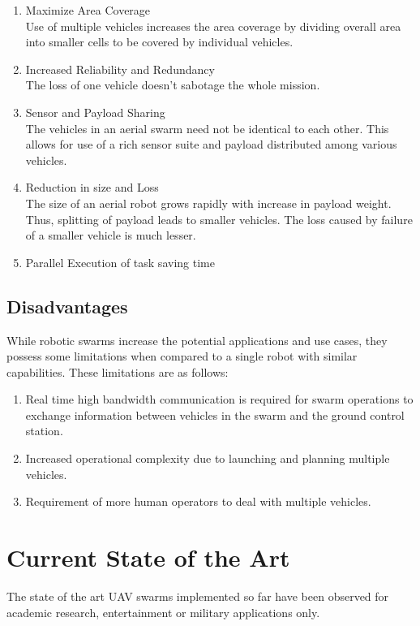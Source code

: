 \begin{spacing}{2}
\begin{enumerate}
    \item Maximize Area Coverage \\Use of multiple vehicles increases the area coverage by dividing overall area into smaller cells to be covered by individual vehicles.
    \item Increased Reliability and Redundancy \\The loss of one vehicle doesn't sabotage the whole mission.
    \item Sensor and Payload Sharing \\The vehicles in an aerial swarm need not be identical to each other. This allows for use of a rich sensor suite and payload distributed among various vehicles.
    \item Reduction in size and Loss \\The size of an aerial robot grows rapidly with increase in payload weight. Thus, splitting of payload leads to smaller vehicles. The loss caused by failure of a smaller vehicle is much lesser.
    \item Parallel Execution of task saving time
\end{enumerate}

\subsection*{Disadvantages}
While robotic swarms increase the potential applications and use cases, they possess some limitations when compared to a single robot with similar capabilities. These limitations are as follows:
\begin{enumerate}
    \item Real time high bandwidth communication is required for swarm operations to exchange information between vehicles in the swarm and the ground control station.
    \item Increased operational complexity due to launching and planning multiple vehicles.
    \item Requirement of more human operators to deal with multiple vehicles.
\end{enumerate}

\section{Current State of the Art}
The state of the art UAV swarms implemented so far have been observed for academic research, entertainment or military applications only.


\end{spacing}
